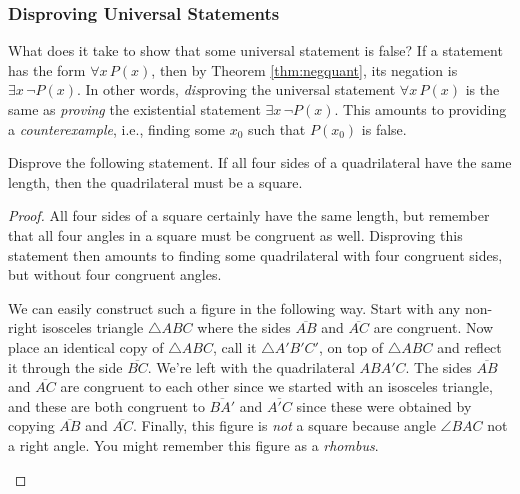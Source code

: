 \subsubsection*{Disproving Universal Statements}
What does it take to show that some universal statement is false?
If a statement has the form $\forall x\, P(x)$, then by Theorem \ref{thm:negquant}, its negation is $\exists x\, \neg P(x)$.
In other words, \emph{dis}proving the universal statement $\forall x\, P(x)$ is the same as \emph{proving} the existential statement $\exists x\, \neg P(x)$.
This amounts to providing a \emph{counterexample}, i.e., finding some $x_0$ such that $P(x_0)$ is false.

\begin{example}
    Disprove the following statement.
    If all four sides of a quadrilateral have the same length, then the quadrilateral must be a square.
\end{example}

\begin{proof}
    All four sides of a square certainly have the same length, but remember that all four angles in a square must be congruent as well.
    Disproving this statement then amounts to finding some quadrilateral with four congruent sides, but without four congruent angles.
    
    We can easily construct such a figure in the following way.
    Start with any non-right isosceles triangle $\triangle ABC$ where the sides $\overline{AB}$ and $\overline{AC}$ are congruent.
    Now place an identical copy of $\triangle ABC$, call it $\triangle A'B'C'$, on top of $\triangle ABC$ and reflect it through the side $\overline{BC}$.
    We're left with the quadrilateral $ABA'C$.
    The sides $\overline{AB}$ and $\overline{AC}$ are congruent to each other since we started with an isosceles triangle, and these are both congruent to $\overline{BA'}$ and $\overline{A'C}$ since these were obtained by copying $\overline{AB}$ and $\overline{AC}$.
    Finally, this figure is \emph{not} a square because angle $\angle BAC$ not a right angle.
    You might remember this figure as a \emph{rhombus}.

    \begin{center}
        \label{fig:pythag1}
    \end{center}
\end{proof}


